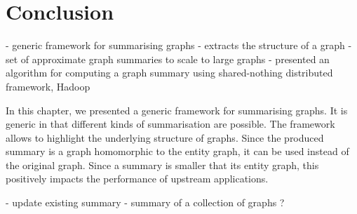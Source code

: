 \section{Conclusion}

- generic framework for summarising graphs
- extracts the structure of a graph
- set of approximate graph summaries to scale to large graphs
- presented an algorithm for computing a graph summary using shared-nothing distributed framework, Hadoop

In this chapter, we presented a generic framework for summarising graphs. It is generic in that different kinds of summarisation are possible. The framework allows to highlight the underlying structure of graphs. Since the produced summary is a graph homomorphic to the entity graph, it can be used instead of the original graph. Since a summary is smaller that its entity graph, this positively impacts the performance of upstream applications.


- update existing summary
- summary of a collection of graphs ?
